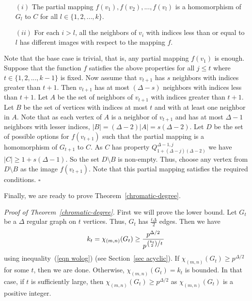 \documentclass[11pt]{article}
\begin{document}
\begin{itemize}
\item[$(i)$] The partial mapping $f(v_1), f(v_2), ..., f(v_l)$ is a homomorphism of  $G_l$ to $C$ for all $l \in \{1,2,...,k\}$.

\item[$(ii)$]  For each $i > l$, all the neighbors of $v_i$ with indices less than or equal to $l$ has different images with respect to the mapping $f$.  
\end{itemize} 

Note that the base case is trivial, that is, any partial mapping $f(v_1)$ is enough. 
Suppose that the function $f$ satisfies the above properties for all $j \leq t$ where $t \in \{1,2,...,k-1\}$ is  fixed. 
Now assume that $v_{t+1}$ has $s$ neighbors with indices greater than $t+1$. 
Then $v_{t+1}$ has at most $(\Delta - s)$ neighbors with  indices less than $t+1$. 
Let $A$ be the set of neighbors of $v_{t+1}$   with  indices greater than $t+1$.
 Let $B$ be the set of vertices   with indices at most $t$ and with at least one neighbor in $A$. 
 Note that as each vertex of $A$ is a neighbor 
 of $v_{t+1}$ and has at most $\Delta-1$ neighbors with lesser indices, $|B| = (\Delta-2)|A| = s(\Delta-2)$. 
 Let $D$ be the set of possible  options for $f(v_{t+1})$ such that the partial mapping 
 is a homomorphism of $G_{t+1}$ to $C$. 
 As $C$ has property $Q^{\Delta-1,j}_{1+(\Delta-j)(\Delta-2)}$ we have $|C| \geq 1+s(\Delta-1)$. 
 So the set $D \setminus B$ is non-empty. 
 Thus, choose any vertex from $D \setminus B$ as the image $f(v_{t+1})$. 
 Note that this partial mapping satisfies the required conditions.  \hfill $ \square $
 
 


\medskip


Finally, we are ready to prove Theorem~\ref{chromatic-degree}.

\medskip

\noindent \textit{Proof of Theorem~\ref{chromatic-degree}.}  First we will prove the lower bound. 
Let $G_t$ be a $\Delta$ regular graph on $t$ vertices. Thus, $G_t$ has $\frac{t \Delta}{2}$  edges. Then 
we have $$k_t = \chi_{(m,n)}(G_t)  \geq \frac{p^{\Delta /2}}{p^{\left. {k_t \choose 2} \middle/  t \right.}}$$ 
using inequality~(\ref{eqn wolog}) (see Section~\ref{sec acyclic}). If $\chi_{(m,n)}(G_t) \geq p^{\Delta /2} $ for some $t$, then we are done. 
Otherwise, $\chi_{(m,n)}(G_t) = k_t$ is bounded. In that case, if $t$ is sufficiently large, then $\chi_{(m,n)}(G_t) \geq p^{\Delta /2}$ as 
$\chi_{(m,n)}(G_t)$ is a positive integer.
\end{document}
